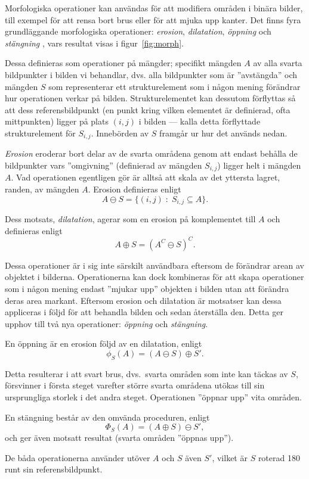 \documentclass[../rapport_MVEX01-11-05]{subfiles}
\begin{document}
Morfologiska operationer kan användas för att modifiera områden i
binära bilder, till exempel för att rensa bort brus eller för att
mjuka upp kanter. Det finns fyra grundläggande morfologiska
operationer: \emph{erosion}, \emph{dilatation}, \emph{öppning} och
\emph{stängning} \cite[s.~25]{Rudemo09}, vars resultat visas i figur~\ref{fig:morph}.

Dessa definieras som operationer på mängder; specifikt mängden $A$
av alla svarta bildpunkter i bilden vi behandlar, dvs. alla bildpunkter som är
''avstängda'' och mängden $S$ som representerar ett strukturelement
som i någon mening förändrar hur operationen verkar på bilden.
Strukturelementet kan dessutom förflyttas så att dess
referensbildpunkt (en punkt kring vilken elementet är definierad, ofta
mittpunkten)
ligger på plats $(i,j)$ i bilden --- kalla detta förflyttade
strukturelement för $S_{i,j}$. Innebörden av $S$ framgår ur hur det används
nedan.

\emph{Erosion} eroderar bort delar av de svarta områdena genom
att endast behålla de bildpunkter vars ''omgivning'' (definierad av mängden
$S_{i,j}$) ligger helt i mängden $A$. Vad operationen egentligen gör är alltså
att skala av det yttersta lagret, randen, av mängden $A$. Erosion definieras enligt
\begin{equation*}
  A\ominus S = \{(i,j)\;:\;S_{i,j}\subseteq A\}.
\end{equation*}

Dess motsats, \emph{dilatation}, agerar som
en erosion på komplementet till $A$ och definieras enligt
\begin{equation*}
  A\oplus S = (A^C\ominus S)^C.
\end{equation*}

Dessa operationer är i sig inte särskilt användbara eftersom de förändrar
arean av objektet i bilderna. Operationerna kan dock kombineras för
att skapa operationer som i någon mening endast 
''mjukar upp'' objekten i bilden utan att förändra deras area markant.
Eftersom erosion och dilatation är motsatser kan dessa appliceras i
följd för att behandla bilden och
sedan återställa den. Detta ger upphov till två nya operationer:
\emph{öppning} och \emph{stängning}.

En öppning är en erosion följd av en dilatation, enligt
\begin{equation*}
  \phi_S(A)=(A\ominus S)\oplus S'.
\end{equation*}

Detta resulterar i att svart brus, dvs.~svarta områden som inte kan täckas
av $S$, försvinner i
första steget varefter större svarta områdena utökas till sin ursprungliga
storlek i det andra
steget. Operationen ''öppnar upp'' vita områden.

En stängning består av den omvända proceduren, enligt
\begin{equation*}
  \Phi_S(A)=(A\oplus S)\ominus S',
\end{equation*}
och ger även motsatt resultat (svarta områden ''öppnas upp'').

De
båda operationerna använder utöver $A$ och $S$ även $S'$, vilket är
$S$ roterad 180\textdegree{} runt sin referensbildpunkt.
\end{document}
